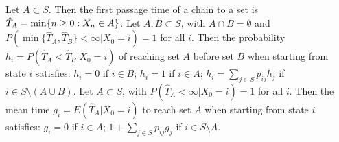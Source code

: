  Let $A \subset S$. Then the first passage time of a chain to a set is $\Hat{T}_A = \min\{n \ge 0: X_n \in A\}$.
 Let $A, B \subset S$, with $A \cap B = \emptyset$ and $P(\min\{\hat{T}_A, \hat{T}_B\} < \infty | X_0 = i) = 1$ for all $i$. Then the probability $h_i = P(\hat{T}_A < \hat{T}_B | X_0 = i)$ of reaching set $A$ before set $B$ when starting from state $i$ satisfies: $h_i = 0$ if $i \in B$; $h_i  = 1$ if $i \in A$; $h_i = \sum_{j \in S} p_{ij}h_j$ if $i \in S \setminus (A \cup B)$.
 Let $A \subset S$, with $P(\hat{T}_A < \infty | X_0 = i) = 1$ for all $i$. Then the mean time $g_i = E(\hat{T}_A | X_0 = i)$ to reach set $A$ when starting from state $i$ satisfies: $g_i = 0$ if $i \in A$; $1 + \sum_{j \in S} p_{ij}g_j$ if $i \in S \setminus A$.